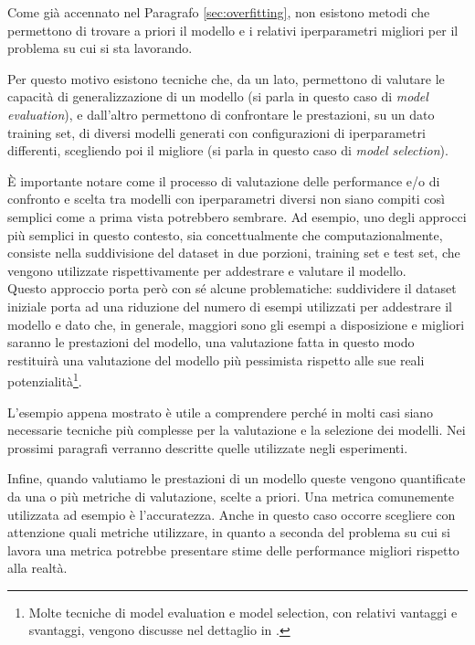 \documentclass[../../main.tex]{subfiles}
\begin{document}
    Come già accennato nel Paragrafo \ref{sec:overfitting}, non esistono metodi che permettono di trovare a priori il modello e i relativi iperparametri migliori per il problema su cui si sta lavorando.

    Per questo motivo esistono tecniche che, da un lato, permettono di valutare le capacità di generalizzazione di un modello (si parla in questo caso di \textit{model evaluation}), e dall'altro permettono di confrontare le prestazioni, su un dato training set, di diversi modelli generati con configurazioni di iperparametri differenti, scegliendo poi il migliore (si parla in questo caso di \textit{model selection}).
   
    È importante notare come il processo di valutazione delle performance e/o di confronto e scelta tra modelli con iperparametri diversi non siano compiti così semplici come a prima vista potrebbero sembrare. Ad esempio, uno degli approcci più semplici in questo contesto, sia concettualmente che computazionalmente, consiste nella suddivisione del dataset in due porzioni, training set e test set, che vengono utilizzate rispettivamente per addestrare e valutare il modello.\\
    Questo approccio porta però con sé alcune problematiche: suddividere il dataset iniziale porta ad una riduzione del numero di esempi utilizzati per addestrare il modello e dato che, in generale, maggiori sono gli esempi a disposizione e migliori saranno le prestazioni del modello, una valutazione fatta in questo modo restituirà una valutazione del modello più pessimista rispetto alle sue reali potenzialità\footnote{Molte tecniche di model evaluation e model selection, con relativi vantaggi e svantaggi, vengono discusse nel dettaglio in \cite{raschka2020model}.}.

    L'esempio appena mostrato è utile a comprendere perché in molti casi siano necessarie tecniche più complesse per la valutazione e la selezione dei modelli. Nei prossimi paragrafi verranno descritte quelle utilizzate negli esperimenti.

    Infine, quando valutiamo le prestazioni di un modello queste vengono quantificate da una o più metriche di valutazione, scelte a priori. Una metrica comunemente utilizzata ad esempio è l'accuratezza. Anche in questo caso occorre scegliere con attenzione quali metriche utilizzare, in quanto a seconda del problema su cui si lavora una metrica potrebbe presentare stime delle performance migliori rispetto alla realtà.
\end{document}
